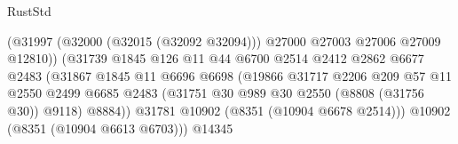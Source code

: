 \begin{lexlean}{RustStd}
\begin{coremodule}
                                              (@31997
                                                (@32000 (@32015 (@32092 @32094)))
                                                @27000
                                                @27003
                                                @27006
                                                @27009
                                                @12810))
                                            (@31739
                                              @1845
                                              @126
                                              @11
                                              @44
                                              @6700
                                              @2514
                                              @2412
                                              @2862
                                              @6677
                                              @2483
                                              (@31867
                                                @1845
                                                @11
                                                @6696
                                                @6698
                                                (@19866
                                                  @31717
                                                  @2206
                                                  @209
                                                  @57
                                                  @11
                                                  @2550
                                                  @2499
                                                  @6685
                                                  @2483
                                                  (@31751
                                                    @30
                                                    @989
                                                    @30
                                                    @2550
                                                    (@8808 (@31756 @30))
                                                    @9118)
                                                  @8884))
                                              @31781
                                              @10902
                                              (@8351 (@10904 @6678 @2514)))
                                            @10902
                                            (@8351 (@10904 @6613 @6703)))
                                          @14345

\end{coremodule}
\end{lexlean}
